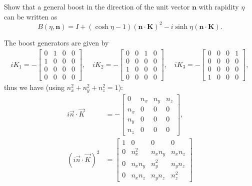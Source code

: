 \documentclass[notes.tex]{subfiles}
\begin{document}
\begin{Exercise}[]
Show that a general boost in the direction of the unit vector $\mathbf n$ with rapidity $\eta$ can be written as
\begin{equation*}
B(\eta,\mathbf n)=I+(\cosh\eta-1)(\mathbf n \cdot \mathbf K)^2-i\sinh\eta (\mathbf n \cdot \mathbf K).
\end{equation*}
\end{Exercise}
\begin{Answer}
The boost generators are given by
\begin{align*}
    iK_1=- \begin{bmatrix}
        0 & 1 & 0 & 0\\
        1 & 0 & 0 & 0\\
        0 & 0 & 0 & 0\\
        0 & 0 & 0 & 0
    \end{bmatrix}, \quad
    iK_2=- \begin{bmatrix}
        0 & 0 & 1 & 0\\
        0 & 0 & 0 & 0\\
        1 & 0 & 0 & 0\\
        0 & 0 & 0 & 0
    \end{bmatrix}, \quad
    iK_3=- \begin{bmatrix}
        0 & 0 & 0 & 1\\
        0 & 0 & 0 & 0\\
        0 & 0 & 0 & 0\\
        1 & 0 & 0 & 0
    \end{bmatrix},
\end{align*}
thus we have (using $n_x^2+n_y^2+n_z^2=1$):
\begin{align*}
    i \vec{n}\cdot\vec{K} &= -\begin{bmatrix}
        0 & n_x & n_y & n_z \\
        n_x & 0 & 0 & 0 \\
        n_y & 0 & 0 & 0 \\
        n_z & 0 & 0 & 0
    \end{bmatrix},
    \\
    (i \vec{n} \cdot \vec{K})^2 &= \begin{bmatrix}
        1 & 0 & 0 & 0\\
        0 & n_x^2 & n_xn_y & n_xn_z \\
        0 & n_xn_y & n_y^2 & n_yn_z \\
        0 & n_xn_z & n_yn_z & n_z^2
    \end{bmatrix}

\end{align*}
\end{Answer}
\end{document}
